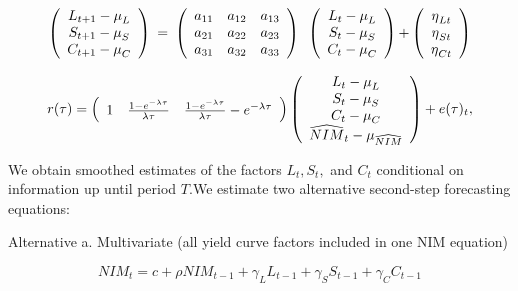 \documentclass[12pt]{article}
\begin{document}
\bigskip
\begin{equation*}
\left(
\begin{array}{c}
{L_{t+1}-\mu _{L}} \\
{S_{t+1}-\mu _{S}} \\
{C_{t+1}-\mu _{C}}%
\end{array}%
\right) {\normalsize \ =\ }\left(
\begin{array}{ccc}
a_{11} & a_{12} & a_{13} \\
a_{21} & a_{22} & a_{23} \\
a_{31} & a_{32} & a_{33}%
\end{array}%
\right) {\normalsize \ }\left(
\begin{array}{c}
{L_{t}-\mu _{L}} \\
{S_{t}-\mu _{S}} \\
{C_{t}-\mu _{C}}%
\end{array}%
\right) {\normalsize +}\left(
\begin{array}{c}
{\eta _{Lt}} \\
{\eta _{St}} \\
{\eta _{Ct}}%
\end{array}%
\right)
\end{equation*}

\begin{equation*}
r(\tau )=\left(
\begin{array}{ccc}
1 & \frac{1-e^{-\lambda \tau }}{\lambda \tau } & \frac{1-e^{-\lambda \tau }}{%
\lambda \tau }-e^{-\lambda \tau }%
\end{array}%
\right) \left(
\begin{array}{c}
{L_{t}-\mu _{L}} \\
{S_{t}-\mu _{S}} \\
{C_{t}-\mu _{C}} \\
\widehat{NIM}_{t}-\mu _{\widehat{NIM}}%
\end{array}%
\right) +e(\tau )_{t},
\end{equation*}

We obtain smoothed estimates of the factors $L_{t},S_{t},$ and $C_{t}$
conditional on information up until period $T.$We estimate two alternative
second-step forecasting equations:

\bigskip Alternative a. {\normalsize Multivariate (all yield curve factors
included in one NIM equation) }

\begin{equation*}
NIM_{t}=c+\rho NIM_{t-1}+\gamma _{L}L_{t-1}+\gamma _{S}S_{t-1}+\gamma
_{C}C_{t-1}
\end{equation*}
\end{document}
